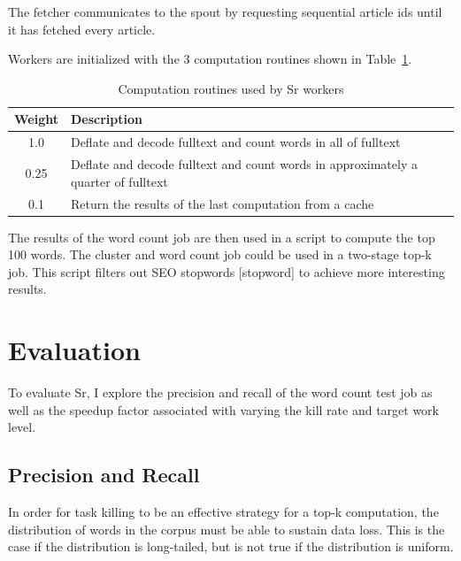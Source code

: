 \documentclass[12pt]{article}
\begin{document}
The fetcher communicates to the spout by requesting sequential article ids until it has fetched
every article.

Workers are initialized with the 3 computation routines shown in Table~\ref{table:workerTasks}.

\begin{table}
\begin{tabularx}{\linewidth}{|c|X|}
 \hline
Weight & Description \\ \hline
1.0 & Deflate and decode fulltext and count words in all of fulltext \\ \hline
0.25 & Deflate and decode fulltext and count words in approximately a quarter of fulltext \\ \hline
0.1 & Return the results of the last computation from a cache \\ \hline
\end{tabularx}
\caption{Computation routines used by Sr workers}
\label{table:workerTasks}
\end{table}

The results of the word count job are then used in a script to compute the top 100 words.
The cluster and word count job could be used in a two-stage top-k job. This script filters
out SEO stopwords [stopword] to achieve more interesting results.

\section{Evaluation}
\label{sec:evaluation}
To evaluate Sr, I explore the precision and recall of the word count test job as well as the
speedup factor associated with varying the kill rate and target work level.

\subsection{Precision and Recall}
In order for task killing to be an effective strategy for a top-k computation, the
distribution of words in the corpus must be able to sustain data loss. This is the case
if the distribution is long-tailed, but is not true if the distribution is uniform.
\end{document}
